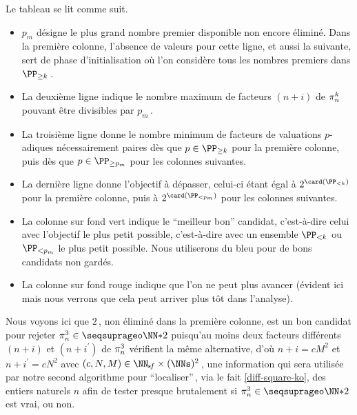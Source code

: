 Le tableau se lit comme suit.
%
\begin{itemize}
	\item $p_m$ désigne le plus grand nombre premier disponible non encore éliminé. Dans la première colonne, l'absence de valeurs pour cette ligne, et aussi la suivante, sert de phase d'initialisation où l'on considère tous les nombres premiers dans $\PP_{\geq k}$\,.

	\item La deuxième ligne indique le nombre maximum de facteurs $(n+i)$ de $\consprod$ pouvant être divisibles par $p_m$\,.

	\item La troisième ligne donne le nombre minimum de facteurs de valuations $p$-adiques nécessairement paires 
	dès que $p \in \PP_{\geq k}$ pour la première colonne, puis 
	dès que $p \in \PP_{\geq p_m}$ pour les colonnes suivantes.

	\item La dernière ligne donne l'objectif à dépasser, celui-ci étant égal 
	à $2^{\card( \PP_{< k} )}$ pour la première colonne, puis
	à $2^{\card( \PP_{< p_m} )}$ pour les colonnes suivantes.

	\item La colonne sur fond vert indique le \enquote{meilleur bon} candidat, c'est-à-dire celui avec l'objectif le plus petit possible, c'est-à-dire avec un ensemble $\PP_{< k}$ ou $\PP_{< p_m} $ le plus petit possible.
	Nous utiliserons du bleu pour de bons candidats non gardés.

	\item La colonne sur fond rouge indique que l'on ne peut plus avancer (évident ici mais nous verrons que cela peut arriver plus tôt dans l'analyse).
\end{itemize}


Nous voyons ici que $2$\,, non éliminé dans la première colonne, est un bon candidat pour rejeter $\consprod<3> \in \NNssquare$ puisqu'au moins deux facteurs différents $(n+i)$ et $(n+i^\prime)$ de $\consprod<3>$ vérifient la même alternative, d'où $n+i = c M^2$ et $n+i^\prime = c N^2$ avec $(c, N, M) \in \NNsf \times ( \NNs )^2$\,, une information qui sera utilisée par notre second algorithme pour \enquote{localiser}\,, via le fait \ref{diff-square-ko}, des entiers naturels $n$ afin de tester presque brutalement si $\consprod<3> \in \NNssquare$ est vrai, ou non.




\medskip

